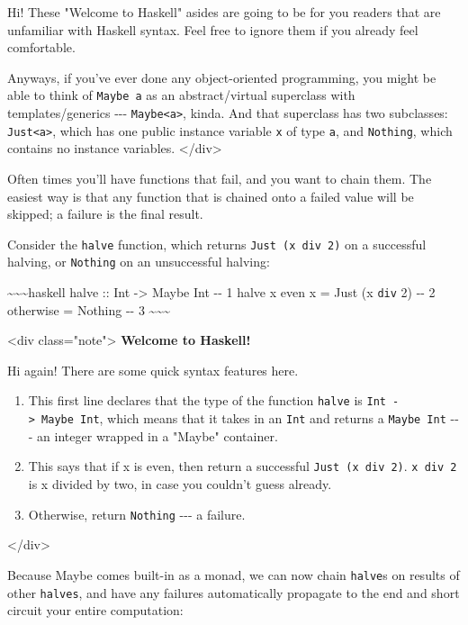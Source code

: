 \documentclass[]{article}
\begin{document}
Hi! These "Welcome to Haskell" asides are going to be for you readers that are
unfamiliar with Haskell syntax. Feel free to ignore them if you already feel
comfortable.

Anyways, if you've ever done any object-oriented programming, you might be able
to think of \texttt{Maybe\ a} as an abstract/virtual superclass with
templates/generics -\/-\/- \texttt{Maybe\textless{}a\textgreater{}}, kinda. And
that superclass has two subclasses: \texttt{Just\textless{}a\textgreater{}},
which has one public instance variable \texttt{x} of type \texttt{a}, and
\texttt{Nothing}, which contains no instance variables.
\textless{}/div\textgreater{}

Often times you'll have functions that fail, and you want to chain them. The
easiest way is that any function that is chained onto a failed value will be
skipped; a failure is the final result.

Consider the \texttt{halve} function, which returns
\texttt{Just\ (x\ \textasciigrave{}div\textasciigrave{}\ 2)} on a successful
halving, or \texttt{Nothing} on an unsuccessful halving:

\textasciitilde{}\textasciitilde{}\textasciitilde{}haskell halve :: Int
-\textgreater{} Maybe Int -\/- 1 halve x \textbar{} even x = Just (x
\texttt{div} 2) -\/- 2 \textbar{} otherwise = Nothing -\/- 3
\textasciitilde{}\textasciitilde{}\textasciitilde{}

\textless{}div class="note"\textgreater{} \textbf{Welcome to Haskell!}

Hi again! There are some quick syntax features here.

\begin{enumerate}
\tightlist
\item
  This first line declares that the type of the function \texttt{halve} is
  \texttt{Int\ -\textgreater{}\ Maybe\ Int}, which means that it takes in an
  \texttt{Int} and returns a \texttt{Maybe\ Int} -\/-\/- an integer wrapped in a
  "Maybe" container.
\item
  This says that if x is even, then return a successful
  \texttt{Just\ (x\ \textasciigrave{}div\textasciigrave{}\ 2)}.
  \texttt{x\ \textasciigrave{}div\textasciigrave{}\ 2} is x divided by two, in
  case you couldn't guess already.
\item
  Otherwise, return \texttt{Nothing} -\/-\/- a failure.
\end{enumerate}

\textless{}/div\textgreater{}

Because Maybe comes built-in as a monad, we can now chain \texttt{halve}s on
results of other \texttt{halves}, and have any failures automatically propagate
to the end and short circuit your entire computation:
\end{document}
